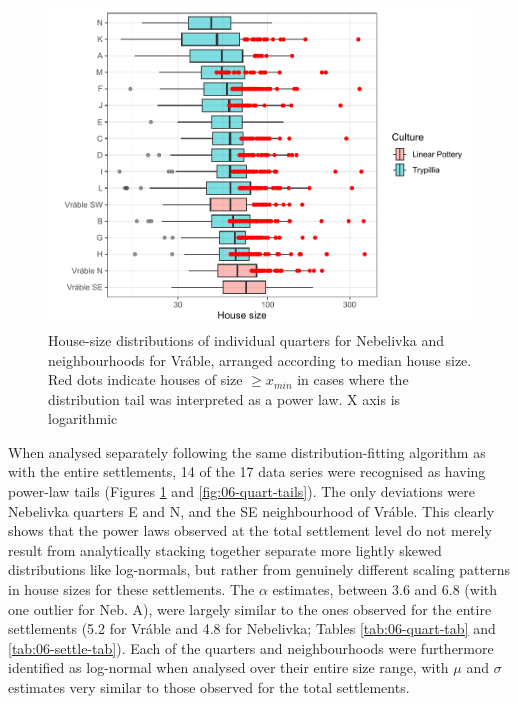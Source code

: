 \documentclass[
  12pt,
]{book}
\begin{document}
\begin{figure}

{\centering \includegraphics[width=0.9\linewidth]{bookdown-demo_files/figure-latex/06-quart-box-1} 

}

\caption{House-size distributions of individual quarters for Nebelivka and neighbourhoods for Vráble, arranged according to median house size. Red dots indicate houses of size \(\geq x_{min}\) in cases where the distribution tail was interpreted as a power law. X axis is logarithmic}\label{fig:06-quart-box}
\end{figure}

When analysed separately following the same distribution-fitting algorithm as with the entire settlements, 14 of the 17 data series were recognised as having power-law tails (Figures \ref{fig:06-quart-box} and \ref{fig:06-quart-tails}). The only deviations were Nebelivka quarters E and N, and the SE neighbourhood of Vráble. This clearly shows that the power laws observed at the total settlement level do not merely result from analytically stacking together separate more lightly skewed distributions like log-normals, but rather from genuinely different scaling patterns in house sizes for these settlements. The \(\alpha\) estimates, between 3.6 and 6.8 (with one outlier for Neb. A), were largely similar to the ones observed for the entire settlements (5.2 for Vráble and 4.8 for Nebelivka; Tables \ref{tab:06-quart-tab} and \ref{tab:06-settle-tab}). Each of the quarters and neighbourhoods were furthermore identified as log-normal when analysed over their entire size range, with \(\mu\) and \(\sigma\) estimates very similar to those observed for the total settlements.
\end{document}
